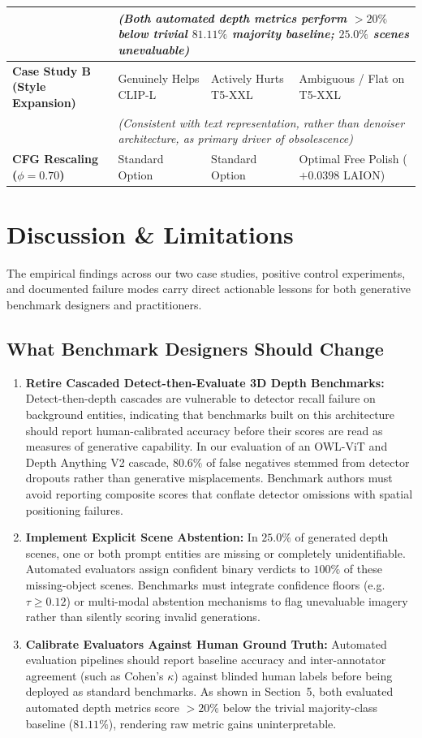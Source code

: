 \documentclass[10pt,twocolumn,letterpaper]{article}
\begin{document}
\begin{table}[t]
{\begin{tabular}{llll}
& \multicolumn{3}{l}{\textit{(Both automated depth metrics perform $>20\%$ below trivial $81.11\%$ majority baseline; $25.0\%$ scenes unevaluable)}} \\
\midrule
\textbf{Case Study B (Style Expansion)} & Genuinely Helps CLIP-L & Actively Hurts T5-XXL & Ambiguous / Flat on T5-XXL \\
& \multicolumn{3}{l}{\textit{(Consistent with text representation, rather than denoiser architecture, as primary driver of obsolescence)}} \\
\midrule
\textbf{CFG Rescaling ($\phi = 0.70$)} & Standard Option & Standard Option & Optimal Free Polish ($+0.0398$ LAION) \\
\bottomrule
\end{tabular}%
}
\end{table}

\section{Discussion \& Limitations}

The empirical findings across our two case studies, positive control experiments, and documented failure modes carry direct actionable lessons for both generative benchmark designers and practitioners.

\subsection{What Benchmark Designers Should Change}
\begin{enumerate}
    \item \textbf{Retire Cascaded Detect-then-Evaluate 3D Depth Benchmarks:} Detect-then-depth cascades are vulnerable to detector recall failure on background entities, indicating that benchmarks built on this architecture should report human-calibrated accuracy before their scores are read as measures of generative capability. In our evaluation of an OWL-ViT and Depth Anything V2 cascade, $80.6\%$ of false negatives stemmed from detector dropouts rather than generative misplacements. Benchmark authors must avoid reporting composite scores that conflate detector omissions with spatial positioning failures.
    \item \textbf{Implement Explicit Scene Abstention:} In $25.0\%$ of generated depth scenes, one or both prompt entities are missing or completely unidentifiable. Automated evaluators assign confident binary verdicts to $100\%$ of these missing-object scenes. Benchmarks must integrate confidence floors (e.g. $\tau \ge 0.12$) or multi-modal abstention mechanisms to flag unevaluable imagery rather than silently scoring invalid generations.
    \item \textbf{Calibrate Evaluators Against Human Ground Truth:} Automated evaluation pipelines should report baseline accuracy and inter-annotator agreement (such as Cohen's $\kappa$) against blinded human labels before being deployed as standard benchmarks. As shown in Section~5, both evaluated automated depth metrics score $>20\%$ below the trivial majority-class baseline ($81.11\%$), rendering raw metric gains uninterpretable.
\end{enumerate}
\end{document}
